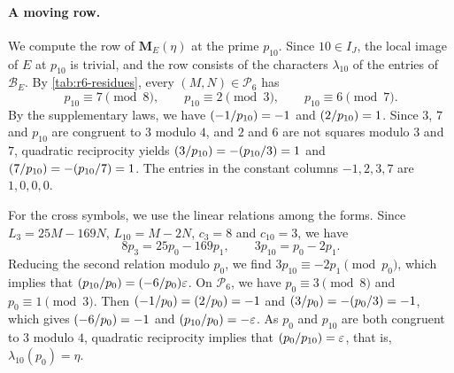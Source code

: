 \documentclass[12pt,oneside,openany]{book}
\theoremstyle{definition}
\theoremstyle{plain}
\numberwithin{equation}{chapter}
\theoremstyle{plain}
\theoremstyle{definition}
\theoremstyle{remark}
\newcommand{\leg}[2]{\mathchoice{\left(\frac{#1}{#2}\right)}{(#1/#2)}{(#1/#2)}{(#1/#2)}}
\newcommand{\cB}{\mathcal B}
\newcommand{\cP}{\mathcal P}
\newcommand{\eps}{\varepsilon}
\begin{document}
\paragraph{A moving row.} We compute the row of $\mathbf M_E(\eta)$ at the prime $p_{10}$. Since $10\in I_J$, the local image of $E$ at $p_{10}$ is trivial, and the row consists of the characters $\lambda_{10}$ of the entries of $\cB_E$. By \cref{tab:r6-residues}, every $(M,N)\in\cP_6$ has
\begin{equation*}
p_{10}\equiv7\pmod8,\qquad p_{10}\equiv2\pmod3,\qquad p_{10}\equiv6\pmod7.
\end{equation*}
By the supplementary laws, we have $\leg{-1}{p_{10}}=-1$ and $\leg2{p_{10}}=1$. Since $3$, $7$ and $p_{10}$ are congruent to $3$ modulo $4$, and $2$ and $6$ are not squares modulo $3$ and $7$, quadratic reciprocity yields $\leg3{p_{10}}=-\leg{p_{10}}3=1$ and $\leg7{p_{10}}=-\leg{p_{10}}7=1$. The entries in the constant columns $-1,2,3,7$ are $1,0,0,0$.

For the cross symbols, we use the linear relations among the forms. Since $L_3=25M-169N$, $L_{10}=M-2N$, $c_3=8$ and $c_{10}=3$, we have
\begin{equation*}
8p_3=25p_0-169p_1,\qquad 3p_{10}=p_0-2p_1.
\end{equation*}
Reducing the second relation modulo $p_0$, we find $3p_{10}\equiv-2p_1\pmod{p_0}$, which implies that $\leg{p_{10}}{p_0}=\leg{-6}{p_0}\eps$. On $\cP_6$, we have $p_0\equiv3\pmod8$ and $p_0\equiv1\pmod3$. Then $\leg{-1}{p_0}=\leg2{p_0}=-1$ and $\leg3{p_0}=-\leg{p_0}3=-1$, which gives $\leg{-6}{p_0}=-1$ and $\leg{p_{10}}{p_0}=-\eps$. As $p_0$ and $p_{10}$ are both congruent to $3$ modulo $4$, quadratic reciprocity implies that $\leg{p_0}{p_{10}}=\eps$, that is, $\lambda_{10}(p_0)=\eta$.
\end{document}
